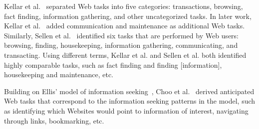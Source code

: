 \documentclass[review]{elsarticle}
\begin{document}
Kellar et al.~\cite{kellar2006goal} separated Web tasks into five categories: transactions, browsing, fact finding, information gathering, and other uncategorized tasks. In later work, Kellar et al.~\cite{kellar2007field} added communication and maintenance as additional Web tasks. Similarly, Sellen et al.~\cite{sellen2002knowledge} identified six tasks that are performed by Web users: browsing, finding, housekeeping, information gathering, communicating, and transacting. Using different terms, Kellar et al. and Sellen et al. both identified highly comparable tasks, such as fact finding and finding [information], housekeeping and maintenance, etc. 

Building on Ellis' model of information seeking~\cite{ellis1989behavioural,ellis1993comparison,ellis1997modelling}, Choo et al.~\cite{choo2000information} derived anticipated Web tasks that correspond to the information seeking patterns in the model, such as identifying which Websites would point to information of interest, navigating through links, bookmarking, etc.  
\end{document}
